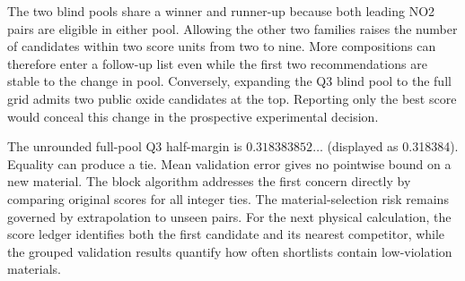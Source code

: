 The two blind pools share a winner and runner-up because both leading NO2 pairs are eligible in either pool. Allowing the other two families raises the number of candidates within two score units from two to nine. More compositions can therefore enter a follow-up list even while the first two recommendations are stable to the change in pool. Conversely, expanding the Q3 blind pool to the full grid admits two public oxide candidates at the top. Reporting only the best score would conceal this change in the prospective experimental decision.

The unrounded full-pool Q3 half-margin is $0.318383852\ldots$ (displayed as 0.318384). Equality can produce a tie. Mean validation error gives no pointwise bound on a new material. The block algorithm addresses the first concern directly by comparing original scores for all integer ties. The material-selection risk remains governed by extrapolation to unseen pairs. For the next physical calculation, the score ledger identifies both the first candidate and its nearest competitor, while the grouped validation results quantify how often shortlists contain low-violation materials.
